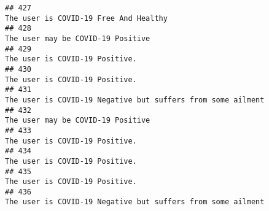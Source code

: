 \documentclass[
]{article}
\begin{document}
\begin{verbatim}
## 427                                                                                                                                                                                                                              The user is COVID-19 Free And Healthy
## 428                                                                                                                                                                                                                                  The user may be COVID-19 Positive
## 429                                                                                                                                                                                                                                     The user is COVID-19 Positive.
## 430                                                                                                                                                                                                                                     The user is COVID-19 Positive.
## 431                                                                                                                                                                                                        The user is COVID-19 Negative but suffers from some ailment
## 432                                                                                                                                                                                                                                  The user may be COVID-19 Positive
## 433                                                                                                                                                                                                                                     The user is COVID-19 Positive.
## 434                                                                                                                                                                                                                                     The user is COVID-19 Positive.
## 435                                                                                                                                                                                                                                     The user is COVID-19 Positive.
## 436                                                                                                                                                                                                        The user is COVID-19 Negative but suffers from some ailment

\end{verbatim}
\end{document}
